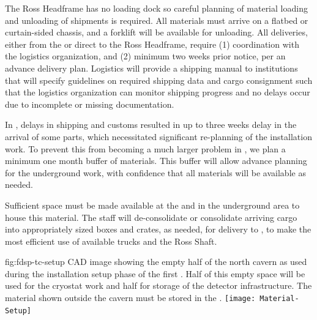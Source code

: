 The Ross Headframe has no loading dock so careful planning of material loading and unloading of shipments is required. 
All materials %
must arrive on a flatbed or curtain-sided chassis, %
and a forklift will be available for unloading. 
All deliveries, either from %
the  or direct to the Ross Headframe, require (1) coordination with the  logistics organization, and (2) minimum two weeks prior notice, per an advance delivery plan.  
Logistics will provide a shipping manual \cite{bib:docdb13954} to  institutions that  
will specify guidelines %
on required shipping data and %
cargo consignment such that the logistics organization can monitor shipping progress and no delays occur due to incomplete or missing documentation. 


In , delays in shipping and customs resulted in up to three weeks delay in the arrival of some parts, which necessitated significant re-planning of the installation work.  To prevent this from becoming a much larger problem in , we plan a minimum one month buffer of materials. This buffer will allow advance planning for the underground work, with confidence that all materials will be available as needed. 

Sufficient space must be made available at the  and in the underground area  to house this material.
The  staff will de-consolidate or consolidate arriving cargo into appropriately sized boxes and crates, as needed, for delivery to , to make the most efficient use of available trucks and the Ross Shaft. 

\begin{dunefigure}{fig:fdsp-tc-setup}
  {CAD image showing the empty half of the north cavern as used during the installation setup phase of the first .  Half of this empty space will be used for the cryostat work and half for storage of the detector infrastructure. The material shown outside the cavern must be stored in the .}
\texttt{[image: Material-Setup]}
\end{dunefigure}


